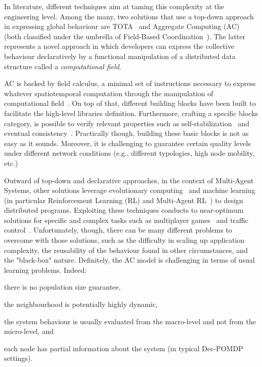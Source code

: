 \documentclass[conference]{IEEEtran}
\begin{document}
In literature, different techniques aim at taming this complexity at the engineering level.
Among the many, two solutions that use a top-down approach in expressing global behaviour are TOTA~\cite{DBLP:journals/tosem/MameiZ09} and Aggregate Computing (AC)~\cite{DBLP:journals/computer/BealPV15} (both classified under the umbrella of Field-Based Coordination~\cite{DBLP:books/daglib/0015276}).
The latter represents a novel approach in which developers can express the collective behaviour declaratively by
a functional manipulation of a distributed data structure called a \emph{computational field}.

AC is backed by field calculus, a minimal set of instructions necessary to express whatever spatiotemporal computation 
through the manipulation of computational field~\cite{DBLP:conf/coordination/AudritoBDV18}. 
On top of that, different building blocks have been built to facilitate the high-level libraries definition.
Furthermore, crafting a specific blocks category, is possible to verify relevant properties such as self-stabilization~\cite{DBLP:conf/coordination/ViroliD14} and eventual consistency~\cite{DBLP:conf/saso/BealVPD16}.
Practically though, building these basic blocks is not as easy as it sounds. 
Moreover, it is challenging to guarantee certain quality levels under different network conditions (e.g., different typologies, high node mobility, etc.)

Outward of top-down and declarative approaches, in the context of Multi-Agent Systems, other solutions leverage evolutionary computing~\cite{DBLP:journals/swarm/BrambillaFBD13} and machine learning (in particular Reinforcement Learning (RL) and Multi-Agent RL~\cite{DBLP:journals/tcyb/NguyenNN20}) to design distributed programs.
Exploiting these techniques conducts to near-optimum solutions for specific and complex tasks such as multiplayer games~\cite{DBLP:journals/nature/VinyalsBCMDCCPE19} and traffic control~\cite{DBLP:journals/aes/JinMK17}.
Unfortunately, though, there can be many different problems to overcome with those solutions, such as
the difficulty in scaling up application complexity, the reusability of the behaviour found in other circumstances, and the "black-box" nature. 
Definitely, the AC model is challenging in terms of usual learning problems. Indeed:
\begin{enumerate*}[label=(\roman*)]
\item there is no population size guarantee,
\item the neighbourhood is potentially highly dynamic,
\item the system behaviour is usually evaluated from the macro-level and not from the micro-level, and
\item each node has partial information about the system (in typical Dec-POMDP~\cite{DBLP:conf/uai/BernsteinZI00} settings).
\end{enumerate*}
\end{document}
